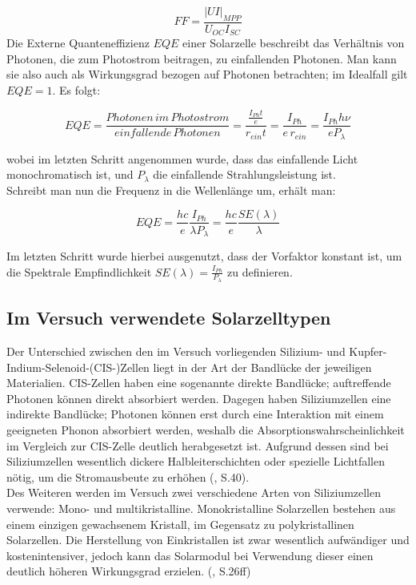 \begin{equation*}
FF = \frac{|UI|_{MPP}}{U_{OC} I_{SC}}
\end{equation*}
Die Externe Quanteneffizienz $EQE$ einer Solarzelle beschreibt das Verhältnis von Photonen, die zum Photostrom beitragen, zu einfallenden Photonen. Man kann sie also auch als Wirkungsgrad bezogen auf Photonen betrachten; im Idealfall gilt $EQE = 1$. Es folgt:

\begin{equation}
EQE = \frac{Photonen \, im \, Photostrom}{einfallende \, Photonen} = \frac{ \frac{I_{Ph}t}{e}}{r_{ein}t} = \frac{I_{Ph}}{e \, r_{ein}} = \frac{I_{Ph} h \nu}{e P_\lambda}
\end{equation}

wobei im letzten Schritt angenommen wurde, dass das einfallende Licht monochromatisch ist, und $P_\lambda$ die einfallende Strahlungsleistung ist. \\
Schreibt man nun die Frequenz in die Wellenlänge um, erhält man:

\begin{equation}
EQE = \frac{h c}{e} \frac{I_{Ph}}{\lambda P_\lambda} = \frac{h c}{e} \frac{SE(\lambda)}{\lambda}
\end{equation}

Im letzten Schritt wurde hierbei ausgenutzt, dass der Vorfaktor konstant ist, um die Spektrale Empfindlichkeit $SE(\lambda) = \frac{I_{Ph}}{P_\lambda}$ zu definieren.

\subsection{Im Versuch verwendete Solarzelltypen}
Der Unterschied zwischen den im Versuch vorliegenden Silizium- und Kupfer-Indium-Selenoid-(CIS-)Zellen liegt in der Art der Bandlücke der 
jeweiligen Materialien. CIS-Zellen haben eine sogenannte direkte Bandlücke; auftreffende Photonen können direkt absorbiert werden. 
Dagegen haben Siliziumzellen eine indirekte Bandlücke; Photonen können erst durch eine Interaktion mit einem geeigneten Phonon 
absorbiert werden, weshalb die Absorptionswahrscheinlichkeit im Vergleich zur CIS-Zelle deutlich herabgesetzt ist. Aufgrund dessen sind 
bei Siliziumzellen wesentlich dickere Halbleiterschichten oder spezielle Lichtfallen nötig, um die Stromausbeute zu erhöhen 
(\cite{Shah2020}, S.40). \\
Des Weiteren werden im Versuch zwei verschiedene Arten von Siliziumzellen verwende: Mono- und multikristalline. Monokristalline 
Solarzellen bestehen aus einem einzigen gewachsenem Kristall, im Gegensatz zu polykristallinen Solarzellen. Die Herstellung von 
Einkristallen ist zwar wesentlich aufwändiger und kostenintensiver, jedoch kann das Solarmodul bei Verwendung dieser einen deutlich 
höheren Wirkungsgrad erzielen. (\cite{Altekrueger2008}, S.26ff)
